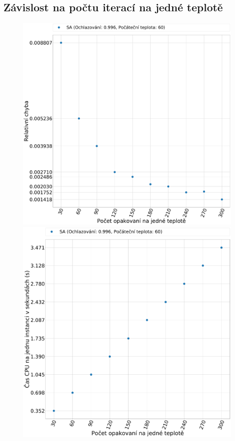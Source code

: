 \documentclass[11pt]{article}
\begin{document}
\subsection{Závislost na počtu iterací na jedné teplotě}
 \begin{figure}
	\centering
    \begin{minipage}[c]{0.49\textwidth}
        \centering\includegraphics[width=\textwidth]{img/CE.pdf} 
    \end{minipage}
    \begin{minipage}[c]{0.49\textwidth}
        \centering \includegraphics[width=\textwidth]{img/CT.pdf} 

\end{minipage}
\end{figure}
\end{document}
